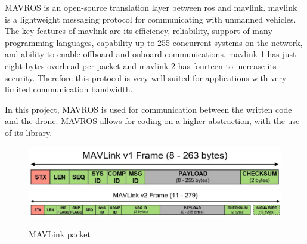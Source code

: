 MAVROS is an open\hyp{}source translation layer between \acs{ros} and \acs{mavlink}. \acs{mavlink} is a lightweight messaging protocol for communicating with unmanned vehicles. The key features of \acs{mavlink} are its efficiency, reliability, support of many programming languages, capability up to 255 concurrent systems on the network, and ability to enable offboard and onboard communications. \acs{mavlink} 1 has just eight bytes overhead per packet and \acs{mavlink} 2 has fourteen to increase its security. Therefore this protocol is very well suited for applications with very limited communication bandwidth. \cite{mavlink_developer_guide}

In this project, MAVROS is used for communication between the written code and the drone. MAVROS allows for coding on a higher abstraction, with the use of its library.

\begin{figure}[!h]
  \centering
  \includegraphics[width=0.65\linewidth]{images/packet_mavlink_v1.jpg}
  \includegraphics[width=\linewidth]{images/packet_mavlink_v2.jpg}
  \caption{MAVLink packet}
\end{figure}


